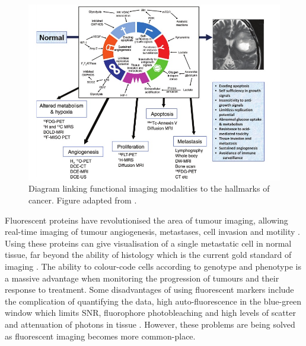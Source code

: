 \documentclass[12pt]{article}
\begin{document}




\begin{figure}[H]
\centering
\includegraphics[scale=0.6]{Padhani_2010_hallmarks.jpg}
\caption{Diagram linking functional imaging modalities to the hallmarks of cancer. Figure adapted from \cite{Padhani:2010hfa}.} %
\label{fig:padhani}
\end{figure}


Fluorescent proteins have revolutionised the area of tumour imaging, allowing real-time imaging of tumour angiogenesis, metastases, cell invasion and motility \cite{Hoffman:2005}. Using these proteins can give visualisation of a single metastatic  cell in normal tissue, far beyond the ability of histology which is the current gold standard of imaging \cite{Hoffman:2009}. The ability to colour-code cells according to genotype and phenotype is a massive advantage when monitoring the progression of tumours and their response to treatment.
Some disadvantages of using fluorescent markers include the complication of  quantifying the data, high auto-fluorescence in the blue-green window which limits SNR, fluorophore photobleaching and high levels of scatter and attenuation of photons in tissue \cite{Gross:2005}. However, these problems are being solved as fluorescent imaging becomes more common-place. 
\end{document}
